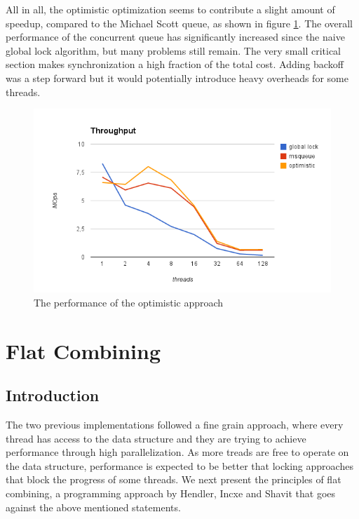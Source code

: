 All in all, the optimistic optimization seems to contribute a slight amount of speedup, compared to the Michael Scott queue, as shown in figure \ref{queue_optimistic_perf}. The overall performance of the concurrent queue has significantly increased since the naive global lock algorithm, but many problems still remain. The very small critical section makes synchronization a high fraction of the total cost. Adding backoff was a step forward but it would potentially introduce heavy overheads for some threads.


\begin{figure}
 \centering
  \includegraphics[scale=0.5]{queue_optimistic_perf.png}
\caption{The performance of the optimistic approach}
\label{queue_optimistic_perf}
\end{figure}

\section{Flat Combining}
\subsection{Introduction}

The two previous implementations followed a fine grain approach, where every thread has access to the data structure and they are trying to achieve performance through high parallelization. As more treads are free to operate on the data structure, performance is expected to be better that locking approaches that block the progress of some threads. We next present the principles of flat combining, a programming approach by Hendler, Incxe and Shavit \cite{flat_combining} that goes against the above mentioned statements.

